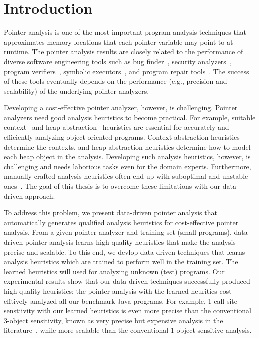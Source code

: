 \listoftodos
\chapter{Introduction}
Pointer analysis is one of the most important program analysis techniques that approximates memory locations that each pointer variable may point to at runtime.
The pointer analysis results are closely related to the performance of diverse software engineering tools such as
bug finder~\cite{Naik2006,NaikPSG09,Blackshear2015,Sui2014,Livshits2003}, security analyzers~\cite{Avots2005,Arzt2014,Tripp2009,Yan2017,Grech17},
program verifiers~\cite{Fink2008}, symbolic executors~\cite{Kapus2019}, and program repair tools~\cite{memfix,Gao2015,vfix2019,saver2020}. 
The success of these tools eventually depends on the performance (e.g., precision and scalability) of the underlying pointer analyzers.


Developing a cost-effective pointer analyzer, however, is challenging.
Pointer analyzers need good analysis heuristics to become practical. 
For example, suitable context~\cite{KastrinisS13a,Li2018b,Li2018a,Smaragdakis2014,Tan2021,Lu:2019:PYF,JeJeChOh17} and heap abstraction~\cite{Tan2017,TanLX16} heuristics are essential for accurately and efficiently analyzing object-oriented programs. 
Context abstraction heuristics determine the contexts, and heap abstraction heuristics determine how to model each heap object in the analysis. 
Developing such analysis heuristics, however, is challenging and needs laborious tasks even for the domain experts. Furthermore, manually-crafted analysis heuristics often end up with suboptimal and unstable ones~\cite{JeJeChOh17}. The goal of this thesis is to overcome these limitations with our data-driven approach.


To address this problem, we present data-driven pointer analysis that automatically generates qualified analysis heuristics for cost-effective pointer analysis.
From a given pointer analyzer and training set (small programs), data-driven pointer analysis learns high-quality heuristics that make the analysis precise and scalable. To this end, we devlop data-driven techniques that learns analysis heuristics which are trained to perform well in the training set. The learned heuristics will used for analyzing unknown (test) programs. Our experimental results show that our data-driven techniques successfully produced high-quality heuristics; the pointer analysis with the learned heuritics cost-efftively analyzed all our benchmark Java programs. For example, 1-call-site-senstiivity with our learned heuristics is even more precise than the conventional 3-object sensitivity, known as very precise but expensive analysis in the
literature~\cite{Tan2021}, while more scalable than the conventional 1-object sensitive analysis.


